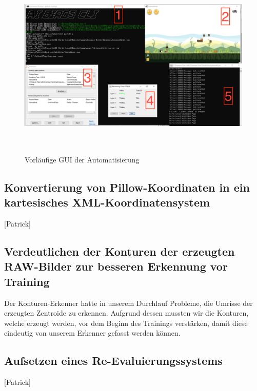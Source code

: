 \begin{figure}
	\centering
	\includegraphics[height=9cm, width=16cm, clip]{img/automator_screen.png}
	\caption{Vorläufige GUI der Automatisierung}
\end{figure}
\subsection{Konvertierung von Pillow-Koordinaten in ein kartesisches XML-Koordinatensystem}
[Patrick]
\subsection{Verdeutlichen der Konturen der erzeugten RAW-Bilder zur besseren Erkennung vor Training}
Der Konturen-Erkenner hatte in unserem Durchlauf Probleme, die Umrisse der erzeugten Zentroide zu erkennen. Aufgrund dessen mussten wir die Konturen, welche erzeugt werden, vor dem Beginn des Trainings verstärken, damit diese eindeutig von unserem Erkenner gefasst werden können. 
\subsection{Aufsetzen eines Re-Evaluierungssystems}
[Patrick]